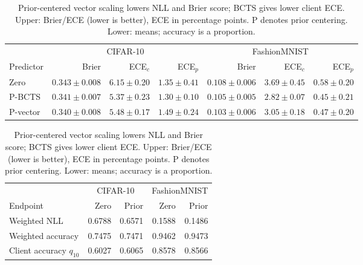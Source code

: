 \begin{table}[!htb]\centering\small\setlength{\tabcolsep}{2.1pt}
\caption{Prior-centered vector scaling lowers NLL and Brier score; BCTS gives lower client ECE. Upper: Brier/ECE (lower is better), ECE in percentage points. P denotes prior centering. Lower: means; accuracy is a proportion.}\label{tab:quality}
\begin{tabular}{@{}lrrrrrr@{}}\toprule
& \multicolumn{3}{c}{CIFAR-10} & \multicolumn{3}{c}{FashionMNIST}\\
Predictor & Brier & ECE$_c$ & ECE$_p$ & Brier & ECE$_c$ & ECE$_p$\\\midrule
Zero & $0.343\pm0.008$ & $6.15\pm0.20$ & $1.35\pm0.41$ & $0.108\pm0.006$ & $3.69\pm0.45$ & $0.58\pm0.20$\\
P-BCTS & $0.341\pm0.007$ & $5.37\pm0.23$ & $1.30\pm0.10$ & $0.105\pm0.005$ & $2.82\pm0.07$ & $0.45\pm0.21$\\
P-vector & $0.340\pm0.008$ & $5.48\pm0.17$ & $1.49\pm0.24$ & $0.103\pm0.006$ & $3.05\pm0.18$ & $0.47\pm0.20$\\\bottomrule
\end{tabular}
\par\medskip
\begin{tabular}{lrrrr}\toprule
& \multicolumn{2}{c}{CIFAR-10} & \multicolumn{2}{c}{FashionMNIST}\\
Endpoint & Zero & Prior & Zero & Prior\\\midrule
Weighted NLL & 0.6788 & 0.6571 & 0.1588 & 0.1486\\
Weighted accuracy & 0.7475 & 0.7471 & 0.9462 & 0.9473\\
Client accuracy $q_{10}$ & 0.6027 & 0.6065 & 0.8578 & 0.8566\\\bottomrule
\end{tabular}
\end{table}
